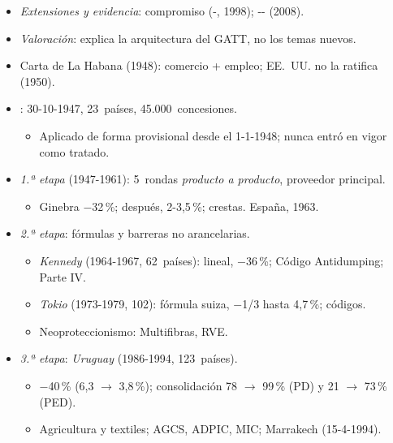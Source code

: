 \documentclass{article}
\begin{document}
\begin{columnas}
\begin{itemize}
  \begin{itemize}
  \item \emph{reciprocidad}: rebajas que dejan la RRI igual;
  \item \emph{NMF}: precio mundial único;
  \item autoejecutable: represalia creíble y acotada $\Rightarrow$ importa el juez.
  \end{itemize}
\item \emph{Extensiones y evidencia}: compromiso (-, 1998); -- (2008).
\item \emph{Valoración}: explica la arquitectura del GATT, no los temas nuevos.
\end{itemize}
\begin{itemize}
\item Carta de La Habana (1948): comercio + empleo; EE.~UU. no la ratifica (1950).
\item {}: 30-10-1947, 23~países, 45.000~concesiones.
  \begin{itemize}
  \item Aplicado de forma provisional desde el 1-1-1948; nunca entró en vigor como tratado.
  \end{itemize}
\end{itemize}
\begin{itemize}
\item \emph{1.ª etapa} (1947-1961): 5~rondas \emph{producto a producto}, proveedor principal.
  \begin{itemize}
  \item Ginebra $-$32\,\%; después, 2-3,5\,\%; crestas. España, 1963.
  \end{itemize}
\item \emph{2.ª etapa}: fórmulas y barreras no arancelarias.
  \begin{itemize}
  \item \emph{Kennedy} (1964-1967, 62~países): lineal, $-$36\,\%; Código Antidumping; Parte IV.
  \item \emph{Tokio} (1973-1979, 102): fórmula suiza, $-$1/3 hasta 4,7\,\%; códigos.
  \item Neoproteccionismo: Multifibras, RVE.
  \end{itemize}
\end{itemize}
\begin{itemize}
\item \emph{3.ª etapa}: \emph{Uruguay} (1986-1994, 123~países).
  \begin{itemize}
  \item $-$40\,\% (6,3 $\to$ 3,8\,\%); consolidación 78 $\to$ 99\,\% (PD) y 21 $\to$ 73\,\% (PED).
  \item Agricultura y textiles; AGCS, ADPIC, MIC; Marrakech (15-4-1994).
  \end{itemize}
\end{itemize}


\end{columnas}
\end{document}

